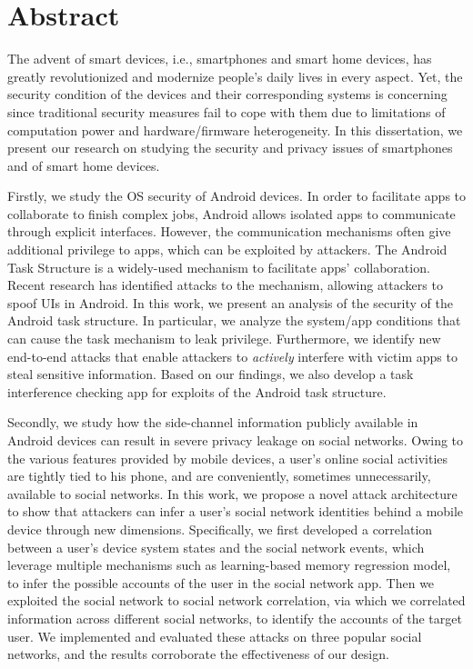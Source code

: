 \documentclass[letterpaper,12pt]{article}
\begin{document}
   \newpage
      \section{Abstract}
   The advent of smart devices, i.e., smartphones and smart home devices, has greatly revolutionized and modernize people's daily lives in every aspect. Yet, the security condition of the devices and their corresponding systems is concerning since traditional security measures fail to cope with them due to limitations of computation power and hardware/firmware heterogeneity. In this dissertation, we present our research on studying the security and privacy issues of smartphones and of smart home devices.
   
   Firstly, we study the OS security of Android devices. In order to facilitate apps to collaborate to finish complex jobs, Android allows isolated apps to communicate through explicit interfaces. However, the communication mechanisms often give additional privilege to apps, which can be exploited by attackers. The Android Task Structure is a widely-used mechanism to facilitate apps' collaboration. Recent research has identified attacks to the mechanism, allowing attackers to spoof UIs in Android. In this work, we present an analysis of the security of the Android task structure. In particular, we analyze the system/app conditions that can cause the task mechanism to leak privilege. Furthermore, we identify new end-to-end attacks that enable attackers to {\em actively} interfere with victim apps to steal sensitive information. Based on our findings, we also develop a task interference checking app for exploits of the Android task structure.
   
    Secondly, we study how the side-channel information publicly available in Android devices can result in severe privacy leakage on social networks. Owing to the various features provided by mobile devices, a user's online social activities are tightly tied to his phone, and are conveniently, sometimes unnecessarily, available to social networks. In this work, we propose a novel attack architecture to show that attackers can infer a user's social network identities behind a mobile device through new dimensions. Specifically, we first developed a correlation between a user's device system states and the social network events, which leverage multiple mechanisms such as learning-based memory regression model, to infer the possible accounts of the user in the social network app. Then we exploited the social network to social network correlation, via which we correlated information across different social networks, to identify the accounts of the target user. We implemented and evaluated these attacks on three popular social networks, and the results corroborate the effectiveness of our design.
    
\end{document}
